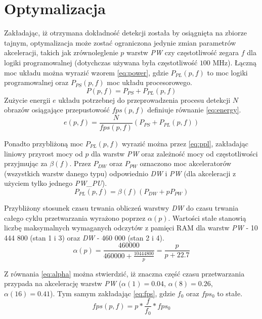 \section{Optymalizacja}
Zakładając, iż otrzymana dokładność detekcji została by osiągnięta na zbiorze tajnym, optymalizacja może zostać ograniczona jedynie zmian parametrów akceleracji, takich jak zrównoleglenie $p$ warstw \emph{PW} czy częstotliwość zegara $f$ dla logiki programowalnej (dotychczas używana była częstotliwość $100$ MHz).
Łączną moc układu można wyrazić wzorem \eqref{eq:power}, gdzie $P_{PL}(p,f)$ to moc logiki programowalnej oraz $P_{PS}(p,f)$ moc układu procesorowego.
\begin{equation}
P(p,f) = P_{PS} + P_{PL}(p,f)
\label{eq:power}
\end{equation}
Zużycie energii $e$ układu potrzebnej do przeprowadzenia procesu detekcji $N$ obrazów osiągające przepustowość $fps(p,f)$ definiuje równanie \eqref{eq:energy}.
\begin{equation}
e(p,f) = \frac{N}{fps(p,f)}(P_{PS} + P_{PL}(p,f))
\label{eq:energy}
\end{equation}

Ponadto przybliżoną moc $P_{PL}(p,f)$ wyrazić można przez \eqref{eq:ppl}, zakładając liniowy przyrost mocy od $p$ dla warstw \emph{PW} oraz zależność mocy od częstotliwości przyjmując za $\beta(f)$. Przez $P_{DW}$ oraz $P_{PW}$ oznaczono moc akceleratorów (wszystkich warstw danego typu) odpowiednio \emph{DW} i \emph{PW} (dla akceleracji z użyciem tylko jednego \emph{PW\_PU}).
\begin{equation}
P_{PL}(p,f) = \beta(f) (P_{DW} + p P_{PW})
\label{eq:ppl}
\end{equation}

Przybliżony stosunek czasu trwania obliczeń warstwy \emph{DW} do czasu trwania całego cyklu przetwarzania wyrażono poprzez $\alpha(p)$. 
Wartości stałe stanowią liczbę maksymalnych wymaganych odczytów z pamięci RAM dla  warstw \emph{PW} - 10 444 800 (stan 1 i 3) oraz \emph{DW} - 460 000 (stan 2 i 4).
\begin{equation}
\alpha(p) = \frac{460 000}{460 000 + \frac{10 444 800}{p}} = \frac{p}{p+22.7}
\label{eq:alpha}
\end{equation}

Z równania \eqref{eq:alpha} można stwierdzić, iż znaczna część czasu przetwarzania przypada na akcelerację warstw \emph{PW} ($\alpha(1) = 0.04$, $\alpha(8) = 0.26$,  $\alpha(16) = 0.41$).
Tym samym zakładając \eqref{eq:fps}, gdzie $f_0$ oraz $fps_0$ to stałe.
\begin{equation}
fps(p,f) = p*\frac{f}{f_0}* fps_0
\label{eq:fps}
\end{equation}

